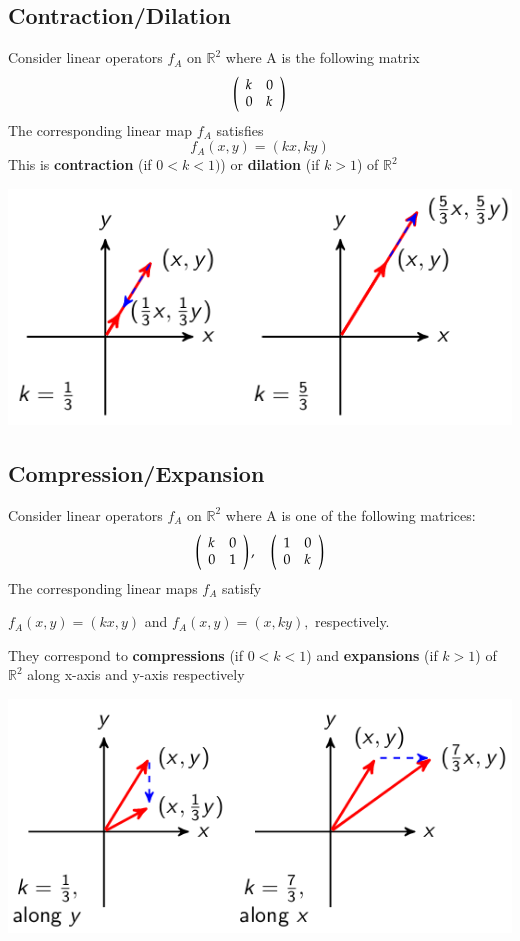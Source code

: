 \documentclass{article}[18pt]
\begin{document}
\subsection{Contraction/Dilation}
Consider linear operators $f_A$ on $\mathbb{R}^2$ where A is the following matrix
$$\left( \begin{array} { l l } { k } & { 0 } \\ { 0 } & { k } \end{array} \right)$$
The corresponding linear map $f_A$ satisfies
$$f _ { A } ( x , y ) = ( k x , k y )$$
This is \textbf{contraction} (if $0<k<1)$) or \textbf{dilation} (if $k>1$) of $\mathbb{R}^2$
\begin{center}
	\includegraphics[scale=0.7]{contraction}
\end{center}
\subsection{Compression/Expansion}
Consider linear operators $f_A$ on $\mathbb{R}^2$ where A is one of the following matrices:
$$\left( \begin{array} { l l } { k } & { 0 } \\ { 0 } & { 1 } \end{array} \right) , \quad \left( \begin{array} { l l } { 1 } & { 0 } \\ { 0 } & { k } \end{array} \right)$$
The corresponding linear maps $f_A$ satisfy
\begin{center}
	$f _ { A } ( x , y ) = ( k x , y )$ and $f _ { A } ( x , y ) = ( x , k y ) ,$ respectively.
\end{center}
They correspond to \textbf{compressions} (if $0<k<1$) and \textbf{expansions} (if $k>1$) of $\mathbb{R}^2$ along x-axis and y-axis respectively
\begin{center}
	\includegraphics[scale=0.7]{compression}
\end{center}
\end{document}
